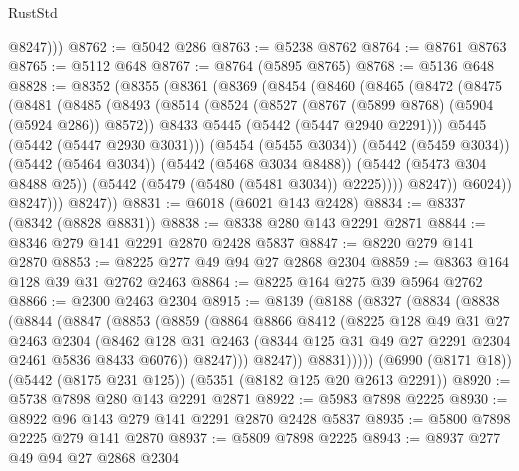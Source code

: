 \begin{lexlean}{RustStd}
\begin{coremodule}
{\begin{coremodule}
{{{{{{{{{{{{          @8247)))
@8762 := @5042 @286
@8763 := @5238 @8762
@8764 := @8761 @8763
@8765 := @5112 @648
@8767 := @8764 (@5895 @8765)
@8768 := @5136 @648
@8828 := @8352
    (@8355
      (@8361
        (@8369
          (@8454
            (@8460
              (@8465
                (@8472
                  (@8475
                    (@8481
                      (@8485
                        (@8493
                          (@8514
                            (@8524
                              (@8527 (@8767 (@5899 @8768) (@5904 (@5924 @286)) @8572))
                              @8433
                              @5445
                              (@5442 (@5447 @2940 @2291)))
                            @5445
                            (@5442 (@5447 @2930 @3031)))
                          (@5454 (@5455 @3034))
                          (@5442 (@5459 @3034))
                          (@5442 (@5464 @3034))
                          (@5442 (@5468 @3034 @8488))
                          (@5442 (@5473 @304 @8488 @25))
                          (@5442 (@5479 (@5480 (@5481 @3034)) @2225))))
                      @8247))
                  @6024))
              @8247)))
        @8247))
@8831 := @6018 (@6021 @143 @2428)
@8834 := @8337 (@8342 (@8828 @8831))
@8838 := @8338 @280 @143 @2291 @2871
@8844 := @8346 @279 @141 @2291 @2870 @2428 @5837
@8847 := @8220 @279 @141 @2870
@8853 := @8225 @277 @49 @94 @27 @2868 @2304
@8859 := @8363 @164 @128 @39 @31 @2762 @2463
@8864 := @8225 @164 @275 @39 @5964 @2762
@8866 := @2300 @2463 @2304
@8915 := @8139
    (@8188
      (@8327
        (@8834
          (@8838
            (@8844
              (@8847
                (@8853
                  (@8859
                    (@8864
                      @8866
                      @8412
                      (@8225
                        @128
                        @49
                        @31
                        @27
                        @2463
                        @2304
                        (@8462
                          @128
                          @31
                          @2463
                          (@8344 @125 @31 @49 @27 @2291 @2304 @2461 @5836 @8433 @6076))
                        @8247)))
                  @8247))
              @8831)))))
    (@6990 (@8171 @18))
    (@5442 (@8175 @231 @125))
    (@5351 (@8182 @125 @20 @2613 @2291))
@8920 := @5738 @7898 @280 @143 @2291 @2871
@8922 := @5983 @7898 @2225
@8930 := @8922 @96 @143 @279 @141 @2291 @2870 @2428 @5837
@8935 := @5800 @7898 @2225 @279 @141 @2870
@8937 := @5809 @7898 @2225
@8943 := @8937 @277 @49 @94 @27 @2868 @2304
}}}}}}}}}}}}
\end{coremodule}}
\end{coremodule}
\end{lexlean}

